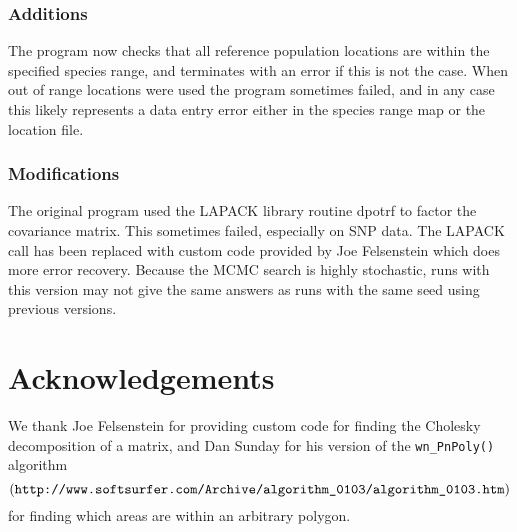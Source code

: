 \documentclass[10pt,titlepage,times,letterpaper]{article}
\begin{document}
\subsubsection{Additions}
The program now checks that all reference population locations are within the
specified species range, and terminates with an error if this is not the case.
When out of range locations were used the program sometimes failed, and in any
case this likely represents a data entry error either in the species range map
or the location file.

\subsubsection{Modifications}
The original program used the LAPACK library routine dpotrf to factor the 
covariance matrix.  This sometimes failed, especially on SNP data.  The LAPACK 
call has been replaced with custom code provided by Joe Felsenstein which does 
more error recovery.  Because the MCMC search is highly stochastic, runs with 
this version may not give the same answers as runs with the same seed using 
previous versions.



\section{Acknowledgements}

We thank Joe Felsenstein for providing custom code for
finding the Cholesky decomposition of a matrix, and Dan Sunday for his version of the
{\tt wn\_PnPoly()} algorithm 
$$(\text{\tt http://www.softsurfer.com/Archive/algorithm\_0103/algorithm\_0103.htm})$$
for finding which areas are within an arbitrary polygon.


%
%
\end{document}
